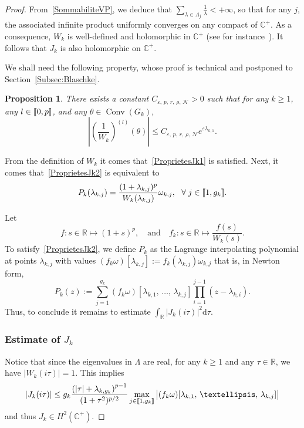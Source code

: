 \documentclass[11pt]{article}
\newtheorem{prop}[theo]{Proposition}
\theoremstyle{definition}
\numberwithin{equation}{section}
\numberwithin{figure}{section}
\numberwithin{table}{section}
\DeclareMathOperator{\Conv}{Conv}
\newcommand{\llbracket}{\mathopen{[\mkern -2.7mu[}}
\newcommand{\rrbracket}{\mathclose{]\mkern -2.7mu]}}
\newcommand{\inter}[2]{\llbracket #1,#2 \rrbracket}
\newcommand{\n}{g}
\newcommand{\NN}{\mathcal{N}}
\newcommand{\R}{\mathbb{R}}
\newcommand{\C}{\mathbb{C}}
\newcommand{\md}{\mathrm{d}}
\let\oldforall\forall
\renewcommand*{\forall}{\mathrel{\oldforall}}
\begin{document}
\begin{proof}
From~\eqref{SommabiliteVP}, we deduce that $\sum_{\lambda\in \Lambda_j}\frac{1}{\lambda}<+\infty$, so that for any $j$, the associated infinite product uniformly converges on any compact of $\C^+$. As a consequence, $W_k$ is well-defined and holomorphic in $\C^+$ (see for instance~\cite[Chapter~15]{RudinAnalyseComplexe}). It follows that $J_k$ is also holomorphic on $\C^+$.

We shall need the following property, whose proof is technical and postponed to Section~\ref{Subsec:Blaschke}.

\begin{prop}\label{Proposition:Blaschke}
There exists a constant $C_{\varepsilon,\,p,\,r,\,\rho,\,\NN}>0$ such that for any $k\geq 1$, any $l \in \inter{0}{p}$, and any $\theta\in \Conv (G_k)$,
\begin{equation}\label{EstimeeFinaleBlaschke}
\left| \left(\frac{1}{W_k} \right)^{(l)}(\theta) \right| \leq C_{\varepsilon,\,p,\,r,\, \rho,\,\NN} e^{\varepsilon \lambda_{k,1}}.
\end{equation}
\end{prop}

From the definition of $W_k$ it comes that~\eqref{ProprietesJk1} is satisfied. Next, it comes that~\eqref{ProprietesJk2} is equivalent to
\[
P_k(\lambda_{k,j}) = \frac{(1+\lambda_{k,j})^p}{W_k(\lambda_{k,j})} \omega_{k,j}, \ \ \forall j\in \inter{1}{\n_k}.
\]

Let
\[
f : s \in \R \mapsto (1+s)^p,
\quad \text{and} \quad f_k : s \in \R \mapsto \frac{f(s)}{W_k(s)}.
\]
To satisfy~\eqref{ProprietesJk2}, we define $P_k$ as the Lagrange interpolating polynomial at points $\lambda_{k,j}$ with values $(f_k \omega)[\lambda_{k,j}]:=f_k(\lambda_{k,j}) \omega_{k,j}$ that is, in Newton form,
\begin{equation*}\label{Def:Pk}
P_k(z) := \sum_{j=1}^{\n_k} (f_k \omega) [\lambda_{k,1},\,\dots,\,\lambda_{k,j}] \prod_{i=1}^{j-1} (z-\lambda_{k,i}).
\end{equation*}
Thus, to conclude it remains to estimate $\displaystyle \int_\R |J_k(i \tau)|^2 \md \tau$.


\subsubsection{Estimate of $J_k$}

Notice that since the eigenvalues in $\Lambda$ are real, for any $k \geq 1$ and any $\tau \in \R$, we have $|W_k(i \tau)|=1$. This implies
\begin{equation}\label{Estimee_Jk_intermediaire}
|J_k(i \tau)| \leq \n_k \frac{\left(|\tau|+\lambda_{k,\n_k}\right)^{p-1}}{(1+\tau^2)^{p/2}} \max_{j\in \inter{1}{\n_k}} \big| (f_k \omega) [\lambda_{k,1},\,\dots,\, \lambda_{k,j}] \big|
\end{equation}
and thus $J_k \in H^2(\C^+)$.



\end{proof}
\end{document}
